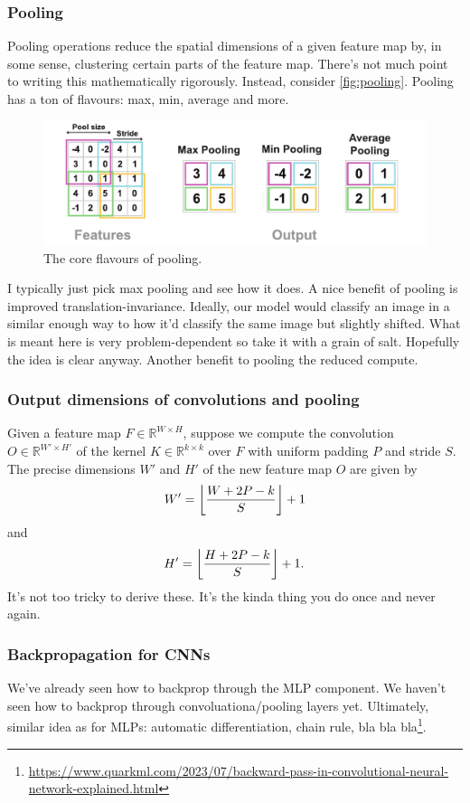 \documentclass[11pt]{article}
\begin{document}
\subsubsection{Pooling}
Pooling operations reduce the spatial dimensions of a given feature map by, in some sense, clustering certain parts of the feature map. There's not much point to writing this mathematically rigorously. Instead, consider \autoref{fig:pooling}. Pooling has a ton of flavours: max, min, average and more.

\begin{figure}[ht]
    \centering
    \includegraphics[width=1\textwidth]{./figures/neural_nets/CNN_pooling.pdf}
    \caption{The core flavours of pooling.}
    \label{fig:pooling}
\end{figure}

\noindent I typically just pick max pooling and see how it does. A nice benefit of pooling is improved translation-invariance. Ideally, our model would classify an image in a similar enough way to how it'd classify the same image but slightly shifted. What is meant here is very problem-dependent so take it with a grain of salt. Hopefully the idea is clear anyway. Another benefit to pooling the reduced compute.

\subsubsection*{Output dimensions of convolutions and pooling}
Given a feature map $F\in\mathbb{R}^{W\times H}$, suppose we compute the convolution $O\in\mathbb{R}^{W'\times H'}$ of the kernel $K\in\mathbb{R}^{k\times k}$ over $F$ with uniform padding $P$ and stride $S$. The precise dimensions $W'$ and $H'$ of the new feature map $O$ are given by
$$
W'
=
\left\lfloor
\frac{W+2P-k}{S}
\right\rfloor
+1
$$
and
$$
H'
=
\left\lfloor
\frac{H+2P-k}{S}
\right\rfloor
+1.
$$
It's not too tricky to derive these. It's the kinda thing you do once and never again.

\subsubsection{Backpropagation for CNNs}
We've already seen how to backprop through the MLP component. We haven't seen how to backprop through convoluationa/pooling layers yet. Ultimately, similar idea as for MLPs: automatic differentiation, chain rule, bla bla bla\footnote{\url{https://www.quarkml.com/2023/07/backward-pass-in-convolutional-neural-network-explained.html}}.
\end{document}
